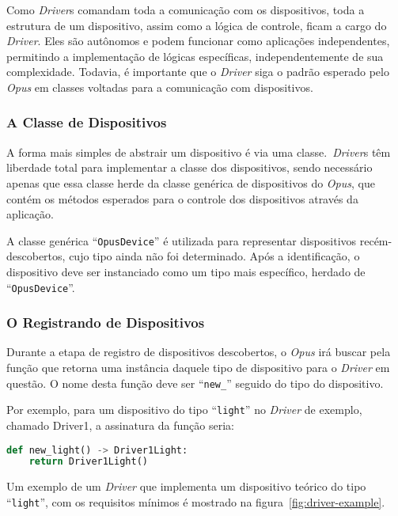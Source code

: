 Como \emph{Driver}s comandam toda a comunicação com os dispositivos, toda a estrutura de um dispositivo, assim como a lógica de controle, 
ficam a cargo do \emph{Driver}. Eles são autônomos e podem funcionar como aplicações independentes, permitindo a implementação de lógicas específicas,
independentemente de sua complexidade. Todavia, é importante que o \emph{Driver} siga o padrão esperado pelo \emph{Opus} em classes
voltadas para a comunicação com dispositivos.

\subsubsection{A Classe de Dispositivos}
A forma mais simples de abstrair um dispositivo é via uma classe.\ \emph{Driver}s têm liberdade total para implementar a classe dos dispositivos,
sendo necessário apenas que essa classe herde da classe genérica de dispositivos do \emph{Opus}, que contém os métodos esperados para 
o controle dos dispositivos através da aplicação. 

A classe genérica ``\lstinline{OpusDevice}'' é utilizada para representar dispositivos recém-descobertos, cujo tipo ainda não foi determinado. 
Após a identificação, o dispositivo deve ser instanciado como um tipo mais específico, herdado de ``\lstinline{OpusDevice}''. 

\subsubsection{O Registrando de Dispositivos}\label{sec:registrando-dispositivos-driver}
Durante a etapa de registro de dispositivos descobertos, o \emph{Opus} irá buscar pela função que retorna uma instância daquele tipo de dispositivo para o
\emph{Driver} em questão. O nome desta função deve ser ``\lstinline{new_}'' seguido do tipo do dispositivo. 

Por exemplo, para um dispositivo do tipo ``\lstinline{light}'' no \emph{Driver} de exemplo, chamado Driver1, a assinatura da função seria:

\begin{lstlisting}[language=Python]
def new_light() -> Driver1Light:
    return Driver1Light()
\end{lstlisting}

Um exemplo de um \emph{Driver} que implementa um dispositivo teórico do tipo ``\lstinline{light}'', com os requisitos mínimos é mostrado 
na figura~\ref{fig:driver-example}.